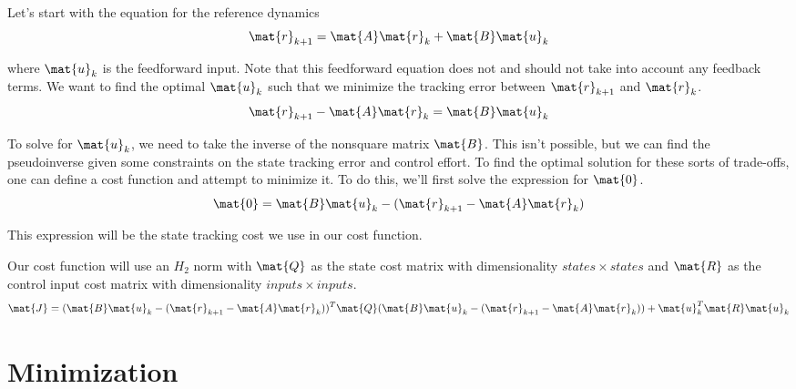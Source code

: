 Let's start with the equation for the \gls{reference} dynamics
\begin{equation*}
  \mat{r}_{k+1} = \mat{A}\mat{r}_k + \mat{B}\mat{u}_k
\end{equation*}

where $\mat{u}_k$ is the feedforward input. Note that this feedforward equation
does not and should not take into account any feedback terms. We want to find
the optimal $\mat{u}_k$ such that we minimize the \gls{tracking} error between
$\mat{r}_{k+1}$ and $\mat{r}_k$.
\begin{equation*}
  \mat{r}_{k+1} - \mat{A}\mat{r}_k = \mat{B}\mat{u}_k
\end{equation*}

To solve for $\mat{u}_k$, we need to take the inverse of the nonsquare matrix
$\mat{B}$. This isn't possible, but we can find the pseudoinverse given some
constraints on the \gls{state} \gls{tracking} error and \gls{control effort}. To
find the optimal solution for these sorts of trade-offs, one can define a cost
function and attempt to minimize it. To do this, we'll first solve the
expression for $\mat{0}$.
\begin{equation*}
  \mat{0} = \mat{B}\mat{u}_k - (\mat{r}_{k+1} - \mat{A}\mat{r}_k)
\end{equation*}

This expression will be the \gls{state} \gls{tracking} cost we use in our cost
function.

Our cost function will use an $H_2$ norm with $\mat{Q}$ as the \gls{state} cost
matrix with dimensionality $states \times states$ and $\mat{R}$ as the
\gls{control input} cost matrix with dimensionality $inputs \times inputs$.
\begin{equation*}
  \mat{J} = (\mat{B}\mat{u}_k - (\mat{r}_{k+1} - \mat{A}\mat{r}_k))^T \mat{Q}
    (\mat{B}\mat{u}_k - (\mat{r}_{k+1} - \mat{A}\mat{r}_k)) +
    \mat{u}_k^T\mat{R}\mat{u}_k
\end{equation*}

\section{Minimization}

